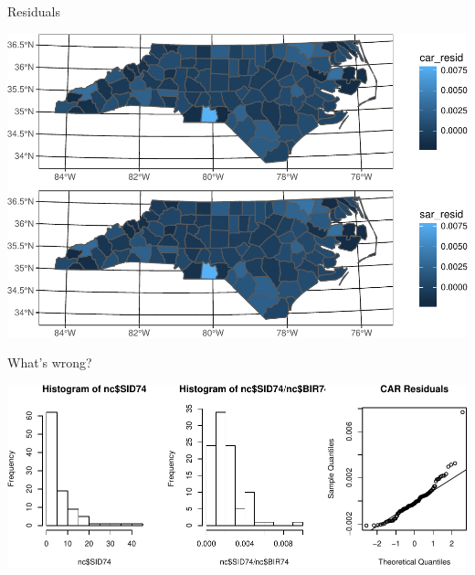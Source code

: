 \documentclass[11pt,ignorenonframetext,]{beamer}
\begin{document}
\begin{frame}{Residuals}
\protect\hypertarget{residuals}{}

\begin{center}\includegraphics[width=\textwidth]{Lec18_files/figure-beamer/unnamed-chunk-16-1} \end{center}

\end{frame}

\begin{frame}{What’s wrong?}
\protect\hypertarget{whats-wrong}{}

\begin{center}\includegraphics[width=\textwidth]{Lec18_files/figure-beamer/unnamed-chunk-17-1} \end{center}

\end{frame}
\end{document}
